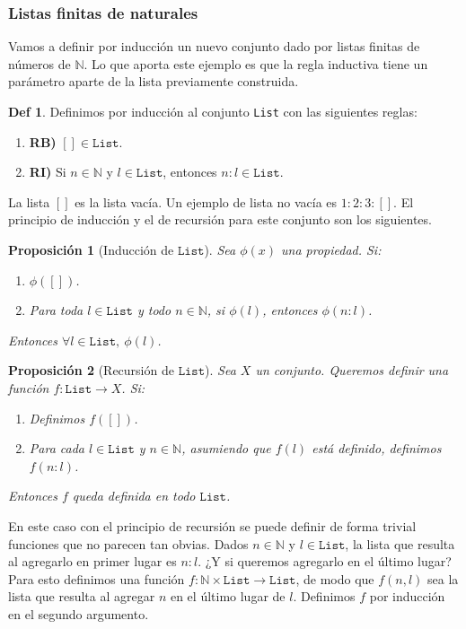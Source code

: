 \documentclass[a4paper, 12pt]{report}
\newcommand{\N}{\mathbb{N}}
\newtheorem*{prop*}{Proposición}
\theoremstyle{definition}
\newtheorem*{definicion*}{Def}
\begin{document}
\subsubsection{Listas finitas de naturales}

Vamos a definir por inducción un nuevo conjunto dado por listas finitas de números de $\N$. Lo que aporta este ejemplo es que la regla inductiva tiene un parámetro aparte de la lista previamente construida.

\begin{definicion*}
	Definimos por inducción al conjunto \texttt{List} con las siguientes reglas:
	\begin{enumerate}
		\item \textbf{RB)} $[]\in\mathtt{List}$.
		\item \textbf{RI)} Si $n\in\N$ y $l\in\mathtt{List}$, entonces $n:l\in\mathtt{List}$.
	\end{enumerate}
\end{definicion*}
La lista $[]$ es la lista vacía. Un ejemplo de lista no vacía es $1:2:3:[]$. El principio de inducción y el de recursión para este  conjunto son los siguientes.
\begin{prop*}[Inducción de $\mathtt{List}$]
	
	Sea $\phi(x)$ una propiedad. Si:
	\begin{enumerate}
		\item $\phi([])$.
		\item Para toda $l\in\mathtt{List}$ y todo $n\in\N$, si $\phi(l)$, entonces $\phi(n:l)$.
	\end{enumerate}
	Entonces $\forall l\in\mathtt{List},~\phi(l)$.
\end{prop*}
\begin{prop*}[Recursión de $\mathtt{List}$]
	Sea $X$ un conjunto. Queremos definir una función $f:\mathtt{List}\to X$. Si:
	\begin{enumerate}
		\item Definimos $f([])$.
		\item Para cada $l\in\mathtt{List}$ y $n\in\N$, asumiendo que $f(l)$ está definido, definimos $f(n:l)$.
	\end{enumerate}
	Entonces $f$ queda definida en todo $\mathtt{List}$.
\end{prop*}
En este caso con el principio de recursión se puede definir de forma trivial funciones que no parecen tan obvias. Dados $n\in\N$ y $l\in\mathtt{List}$, la lista que resulta al agregarlo en primer lugar es $n:l$. ¿Y si queremos agregarlo en el último lugar? Para esto definimos una función $f:\N\times\mathtt{List}\to\mathtt{List}$, de modo que $f(n,l)$ sea la lista que resulta al agregar $n$ en el último lugar de $l$. Definimos $f$ por inducción en el segundo argumento.
\end{document}
